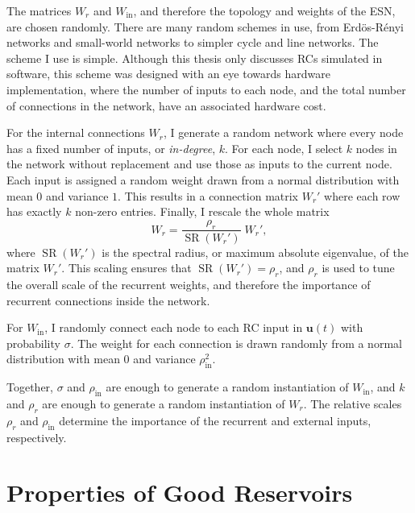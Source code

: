 The matrices $W_r$ and $W_\text{in}$, and therefore the topology and
weights of the ESN, are chosen randomly. There are many random schemes
in use, from Erd{\"{o}}s-R{\'{e}}nyi networks and small-world
networks\cite{haluszczynski2019} to simpler cycle and line
networks.\cite{rodan2011} The scheme I use is simple. Although this
thesis only discusses RCs simulated in software, this scheme was
designed with an eye towards hardware implementation, where the number
of inputs to each node, and the total number of connections in the
network, have an associated hardware cost.

For the internal connections $W_r$, I generate a random network where
every node has a fixed number of inputs, or \emph{in-degree}, $k$. For
each node, I select $k$ nodes in the network without replacement and
use those as inputs to the current node. Each input is assigned a
random weight drawn from a normal distribution with mean $0$ and
variance $1$. This results in a connection matrix $W_r'$ where each
row has exactly $k$ non-zero entries. Finally, I rescale the whole
matrix
\begin{equation}
  \label{eq:setradius}
  W_r = \frac{\rho_r}{\operatorname{SR}(W_r')}\;W_r',
\end{equation}
where $\operatorname{SR}(W_r')$ is the spectral radius, or maximum
absolute eigenvalue, of the matrix $W_r'$. This scaling ensures that
$\operatorname{SR}(W_r') = \rho_r$, and $\rho_r$ is used to tune the
overall scale of the recurrent weights, and therefore the importance
of recurrent connections inside the network.

For $W_\text{in}$, I randomly connect each node to each RC input in
$\bm{u}(t)$ with probability $\sigma$. The weight for each connection
is drawn randomly from a normal distribution with mean $0$ and
variance $\rho_\text{in}^2$.

Together, $\sigma$ and $\rho_\text{in}$ are enough to generate a
random instantiation of $W_\text{in}$, and $k$ and $\rho_r$ are enough
to generate a random instantiation of $W_r$. The relative scales
$\rho_r$ and $\rho_\text{in}$ determine the importance of the
recurrent and external inputs, respectively.


\section{Properties of Good Reservoirs}\label{sec:reservoir-properties}

